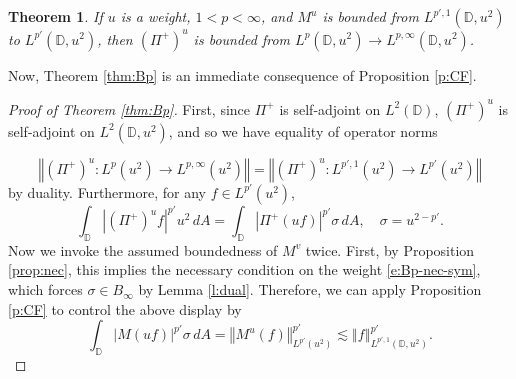 \documentclass{amsart}
\newcommand{\norm}[1]{\left\Vert {#1}\right\Vert}
\newtheorem{theorem}{Theorem}[section]
\theoremstyle{definition}
\numberwithin{equation}{section}
\newcommand{\Mv}{M^v}
\begin{document}
\begin{theorem}\label{thm:Bp-disk}
If $u$ is a weight, $1<p<\infty$, and $M^u$ is bounded from $L^{p',1}(\mathbb{D}, u^2)$ to $L^{p'}(\mathbb{D},u^2)$, then $(\Pi^+)^u$ is bounded from $L^p(\mathbb{D},u^2) \to L^{p,\infty}(\mathbb{D},u^2)$.
\end{theorem}
Now, Theorem \ref{thm:Bp} is an immediate consequence of Proposition \ref{p:CF}. 

\begin{proof}[Proof of Theorem \ref{thm:Bp}]
First, since $\Pi^+$ is self-adjoint on $L^2(\mathbb D)$, $(\Pi^+)^u$ is self-adjoint on $L^2(\mathbb{D},u^2)$, and so we have equality of operator norms 

    \[ \norm{(\Pi^+)^u\colon L^{p}(u^2) \to L^{p,\infty}(u^2) } = \norm{(\Pi^+)^u\colon L^{p',1}(u^2) \to L^{p'}(u^2) } \] 
by duality. Furthermore, for any $f \in L^{p'}(u^2)$,
	\[ \int_{\mathbb{D}} |(\Pi^+)^u f|^{p'} u^2 \, dA = \int_{\mathbb{D}} |\Pi^+(uf)|^{p'} \sigma \, dA, \quad \sigma =u^{2-p'}.\]
Now we invoke the assumed boundedness of $\Mv$ twice. First, by Proposition \ref{prop:nec}, this implies the necessary condition on the weight \eqref{e:Bp-nec-sym}, which forces $\sigma \in B_\infty$ by Lemma \ref{l:dual}. Therefore, we can apply Proposition \ref{p:CF} to control the above display by
	\[ \int_{\mathbb{D}} |M(uf)|^{p'} \sigma \, dA = \norm{M^u(f)}_{L^{p'}(u^2)}^{p'} \lesssim \norm{f}_{L^{p',1}(\mathbb{D},u^2)}^{p'}.\]
\end{proof}
\end{document}
